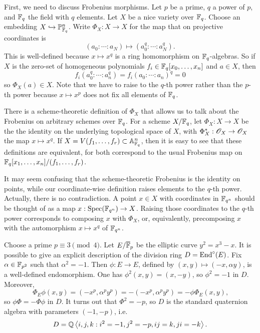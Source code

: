 \documentclass{article}
\begin{document}
First, we need to discuss Frobenius morphisms. Let $p$ be a prime, $q$ a power 
of $p$, and $\mathbb{F}_q$ the field with $q$ elements. Let $X$ be a nice variety over 
$\mathbb{F}_q$. Choose an embedding $X\hookrightarrow \mathbb{P}_{\mathbb{F}_q}^n$. Write 
$\Phi_X:X\to X$ for the map that on projective coordinates is 
\[
  (a_0:\cdots:a_N) \mapsto (a_0^q:\cdots :a_N^q) \text{.}
\]
This is well-defined because $x\mapsto x^q$ is a ring homomorphism on 
$\mathbb{F}_q$-algebras. So if $X$ is the zero-set of homogeneous polynomials 
$f_i\in \mathbb{F}_q[x_0,\dots,x_n]$ and $a\in X$, then 
\[
  f_i(a_0^q:\cdots:a_n^q) = f_i(a_0:\cdots:a_n)^q = 0
\]
so $\Phi_X(a)\in X$. Note that we have to raise to the $q$-th power rather 
than the $p$-th power because $x\mapsto x^p$ does not fix all elements of 
$\mathbb{F}_q$. 

There is a scheme-theoretic definition of $\Phi_X$ that allows us to talk about 
the Frobenius on arbitrary schemes over $\mathbb{F}_q$. For a scheme $X/\mathbb{F}_q$, let 
$\Phi_X:X\to X$ be the the identity on the underlying topological space of $X$, 
with $\Phi_X^\ast:\mathscr{O}_X\to \mathscr{O}_X$ the map $x\mapsto x^q$. If 
$X=V(f_1,\dots,f_r)\subset \mathbb{A}_{\mathbb{F}_q}^n$, then it is easy to see that 
these definitions are equivalent, for both correspond to the usual Frobenius 
map on $\mathbb{F}_q[x_1,\dots,x_n]/(f_1,\dots,f_r)$. 

It may seem confusing that the scheme-theoretic Frobenius is the identity on 
points, while our coordinate-wise definition raises elements to the $q$-th 
power. Actually, there is no contradiction. A point $x\in X$ with coordinates in 
$\mathbb{F}_{q^n}$ should be thought of as a map $x:\operatorname{Spec}(\mathbb{F}_{q^n})\to X$. Raising 
those coordinates to the $q$-th power corresponds to composing $x$ with 
$\Phi_X$, or, equivalently, precomposing $x$ with the automorphism 
$x\mapsto x^q$ of $\mathbb{F}_{q^n}$. 



\begin{example}[Serre]
Choose a prime $p\equiv 3\pmod 4$. Let $E/\overline{\mathbb{F}}_p$ be the elliptic 
curve $y^2=x^3-x$. It is possible to give an explicit description of the 
division ring $D=\operatorname{End}^\circ(E)$. Fix $\alpha\in \mathbb{F}_{p^2}$ such that 
$\alpha^2=-1$. Then $\phi:E\to E$, defined by $(x,y)\mapsto (-x,\alpha y)$, is 
a well-defined endomorphism. One has $\phi^2(x,y)=(x,-y)$, so $\phi^2=-1$ in 
$D$. Moreover, 
\[
  \Phi_E\phi(x,y) = (-x^p, \alpha^p y^p) = -(-x^p, \alpha^p y^p) = -\phi \Phi_E(x,y) \text{,}
\]
so $\phi \Phi=-\Phi \phi$ in $D$. It turns out that $\Phi^2=-p$, so $D$ is the 
standard quaternion algebra with parameters $(-1,-p)$, i.e.  
\[
  D = \mathbb{Q}\left\langle i,j,k : i^2=-1,j^2=-p,i j=k, j i=-k\right\rangle \text{.}
\]
\end{example}
\end{document}
